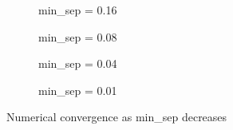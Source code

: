 \begin{figure}[htpb]
    \centering
    \begin{subfigure}[b]{0.475\textwidth}
        \centering
        
        \caption[]{{\small min\_sep = 0.16}}
        \label{fig:u0_dom_err_bs32}
    \end{subfigure}
    \begin{subfigure}[b]{0.475\textwidth}
        \centering
        
        \caption[]{{\small min\_sep = 0.08}}
        \label{fig:u0_dom_err_bs54}
    \end{subfigure}

    \begin{subfigure}[b]{0.475\textwidth}
        \centering
        
        \caption[]{{\small min\_sep = 0.04}}
        \label{fig:u0_dom_err_dp54}
    \end{subfigure}
    \begin{subfigure}[b]{0.475\textwidth}
        \centering
        
        \caption[]{{\small min\_sep = 0.01}}
        \label{fig:u0_dom_err_dp87}
    \end{subfigure}
    \caption[Veni, vidi, Aviici]{Numerical convergence as min\_sep decreases}
    \label{fig:u0_dom_errs}
\end{figure}

